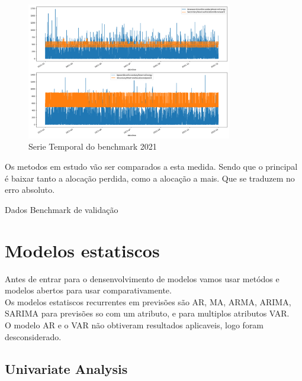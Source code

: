 \begin{figure}[H]
    \centering
    \includegraphics[width=0.8\textwidth]{../plots/benchmark_validation.png}
    \caption{Serie Temporal do benchmark 2021}
    \label{fig:benchmark_validation}
\end{figure}
  

Os metodos em estudo vão ser comparados a esta medida. Sendo que o principal é baixar tanto a alocação perdida, como a alocação a mais. Que se traduzem no erro absoluto.\\

\begin{table}[H]
    \caption{Dados Benchmark de validação}
\end{table}

\section{Modelos estatiscos\label{se:model_stats}}

Antes de entrar para o densenvolvimento de modelos vamos usar metódos e modelos abertos para usar comparativamente.\\

Os modelos estatiscos recurrentes em previsões são AR, MA, ARMA, ARIMA, SARIMA para previsões so com um atributo, e para multiplos atributos VAR.\\
O modelo AR e o VAR não obtiveram resultados aplicaveis, logo foram desconsiderado.\\

\subsection{Univariate Analysis}


